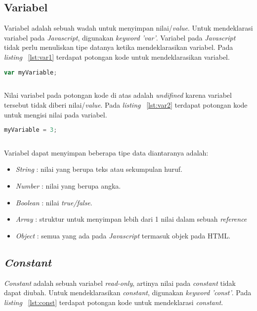 \subsection{Variabel}
Variabel adalah sebuah wadah untuk menyimpan nilai/\textit{value}. Untuk mendeklarasi variabel pada \textit{Javascript}, digunakan \textit{keyword 'var'}. Variabel pada \textit{Javascript} tidak perlu menuliskan tipe datanya ketika mendeklarasikan variabel. Pada \textit{listing} ~\ref{lst:var1} terdapat potongan kode untuk mendeklarasikan variabel.

\begin{lstlisting}[language=Javascript, caption=Deklarasi variabel, label={lst:var1}]
	var myVariable;
	
\end{lstlisting}

Nilai variabel pada potongan kode di atas adalah \textit{undifined} karena variabel tersebut tidak diberi nilai/\textit{value}. Pada \textit{listing} ~\ref{lst:var2} terdapat potongan kode untuk mengisi nilai pada variabel. 

\begin{lstlisting}[language=Javascript, caption=Mengisi nilai sebuah variabel, label={lst:var2}]
	myVariable = 3;	
	
\end{lstlisting}

Variabel dapat menyimpan beberapa tipe data diantaranya adalah:
\begin{itemize}
	\item \textit{String} : nilai yang berupa teks atau sekumpulan huruf.
	\item \textit{Number} : nilai yang berupa angka.
	\item \textit{Boolean} : nilai \textit{true/false}.
	\item \textit{Array} : struktur untuk menyimpan lebih dari 1 nilai dalam sebuah \textit{reference}
	\item \textit{Object} : semua yang ada pada \textit{Javascript} termasuk objek pada HTML.
\end{itemize}

\subsection{\textit{Constant}}
\textit{Constant} adalah sebuah variabel \textit{read-only}, artinya nilai pada \textit{constant} tidak dapat diubah. Untuk mendeklarasikan \textit{constant}, digunakan \textit{keyword 'const'}. Pada \textit{listing} ~\ref{lst:const} terdapat potongan kode untuk mendeklarasi \textit{constant}.

